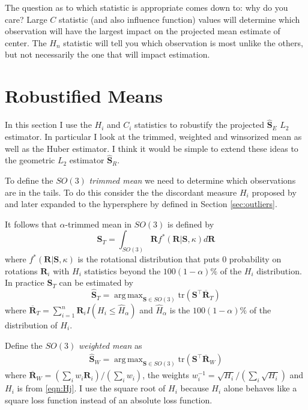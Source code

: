\documentclass{article}\usepackage[]{graphicx}\usepackage[]{color}
\DeclareMathOperator*{\argmax}{arg\,max}
\newcommand{\ProjMean}{{\widehat{\bm S}_{E}}}
\newcommand{\WeightMean}{{\widehat{\bm S}_W}}
\newcommand{\TrimMean}{{\widehat{\bm S}_T}}
\newcommand{\GeomMean}{{\widehat{\bm S}_{R}}}
\begin{document}
The question as to which statistic is appropriate comes down to: why do you care?  Large $C$ statistic (and also influence function) values will determine which observation will have the largest impact on the projected mean estimate of center.  The $H_n$ statistic will tell you which observation is most unlike the others, but not necessarily the one that will impact estimation.

 
\section{Robustified Means}

In this section I use the $H_i$ and $C_i$ statistics to robustify the projected $\ProjMean$ $L_2$ estimator.  In particular I look at the trimmed, weighted and winsorized mean as well as the Huber estimator.  I think it would be simple to extend these ideas to the geometric $L_2$ estimator $\GeomMean$.

To define the $SO(3)$ \emph{trimmed mean} we need to determine which observations are in the tails.  To do this consider the the discordant measure $H_i$ proposed by \cite{best1986} and later expanded to the hypersphere by \cite{figueiredo2005} defined in Section \ref{sec:outliers}.

It follows that $\alpha$-trimmed mean in $SO(3)$ is defined by
\[
\bm S_{T}=\int_{SO(3)}\bm Rf^*(\bm R|\bm S,\kappa)d\bm R
\]
where $f^*(\bm R|\bm S,\kappa)$ is the rotational distribution that puts $0$ probability on rotations $\bm R_i$ with $H_i$ statistics beyond the $100(1-\alpha)\%$ of the $H_i$ distribution.  In practice $\bm S_T$ can be estimated by
\[
\TrimMean=\argmax_{\bm S\in SO(3)}\text{tr}(\bm S^\top\overline{\bm R}_T)
\]
where $\overline{\bm R}_T=\sum_{i=1}^n\bm R_iI( H_i\leq \hat H_\alpha)$ and $\hat H_{\alpha}$ is the $100(1-\alpha)\%$ of the distribution of $H_i$.


Define the $SO(3)$ \emph{weighted mean} as
\begin{align*}
\WeightMean=\argmax_{\bm S\in SO(3)}\text{tr}(\bm S^\top\overline{\bm R}_W)
\end{align*}
where $\overline{\bm R}_W=(\sum_{i}w_i\bm R_i)/(\sum_i w_i)$, the weights $w_i^{-1}=\sqrt{H_i}/(\sum_i \sqrt{H_i})$ and $H_i$ is from \eqref{eqn:Hj}.  I use the square root of $H_i$ because $H_i$ alone behaves like a square loss function instead of an absolute loss function.
\end{document}
